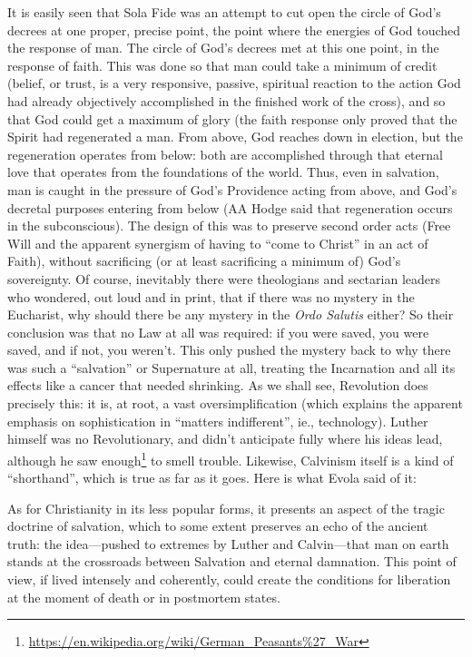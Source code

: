 It is easily seen that Sola Fide was an attempt to cut open the circle of God's decrees at one proper, precise point, the point where the energies of God touched the response of man. The circle of God's decrees met at this one point, in the response of faith. This was done so that man could take a minimum of credit (belief, or trust, is a very responsive, passive, spiritual reaction to the action God had already objectively accomplished in the finished work of the cross), and so that God could get a maximum of glory (the faith response only proved that the Spirit had regenerated a man. From above, God reaches down in election, but the regeneration operates from below: both are accomplished through that eternal love that operates from the foundations of the world. Thus, even in salvation, man is caught in the pressure of God's Providence acting from above, and God's decretal purposes entering from below (AA Hodge said that regeneration occurs in the subconscious). The design of this was to preserve second order acts (Free Will and the apparent synergism of having to ``come to Christ'' in an act of Faith), without sacrificing (or at least sacrificing a minimum of) God's sovereignty. Of course, inevitably there were theologians and sectarian leaders who wondered, out loud and in print, that if there was no mystery in the Eucharist, why should there be any mystery in the \emph{Ordo Salutis} either? So their conclusion was that no Law at all was required: if you were saved, you were saved, and if not, you weren't. This only pushed the mystery back to why there was such a ``salvation'' or Supernature at all, treating the Incarnation and all its effects like a cancer that needed shrinking. As we shall see, Revolution does precisely this: it is, at root, a vast oversimplification (which explains the apparent emphasis on sophistication in ``matters indifferent'', ie., technology). Luther himself was no Revolutionary, and didn't anticipate fully where his ideas lead, although he saw enough\footnote{\url{https://en.wikipedia.org/wiki/German\_Peasants\%27\_War}} to smell trouble. Likewise, Calvinism itself is a kind of ``shorthand'', which is true as far as it goes. Here is what Evola said of it:

\begin{quotex}
As for Christianity in its less popular forms, it presents an aspect of the tragic doctrine of salvation, which to some extent preserves an echo of the ancient truth: the idea---pushed to extremes by Luther and Calvin---that man on earth stands at the crossroads between Salvation and eternal damnation. This point of view, if lived intensely and coherently, could create the conditions for liberation at the moment of death or in postmortem states.
\end{quotex}

